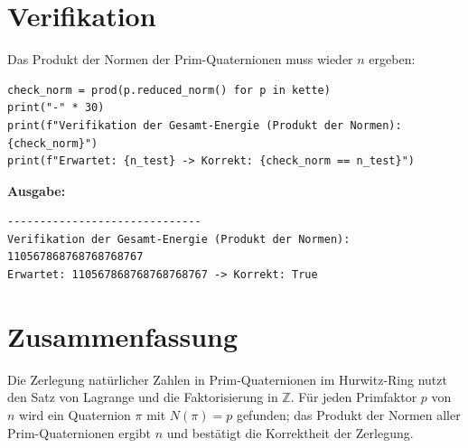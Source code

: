 \documentclass[11pt, a4paper]{article}
\begin{document}
\section{Verifikation}

Das Produkt der Normen der Prim-Quaternionen muss wieder $n$ ergeben:

\begin{lstlisting}
check_norm = prod(p.reduced_norm() for p in kette)
print("-" * 30)
print(f"Verifikation der Gesamt-Energie (Produkt der Normen): {check_norm}")
print(f"Erwartet: {n_test} -> Korrekt: {check_norm == n_test}")
\end{lstlisting}

\textbf{Ausgabe:}
\begin{verbatim}
------------------------------
Verifikation der Gesamt-Energie (Produkt der Normen): 110567868768768768767
Erwartet: 110567868768768768767 -> Korrekt: True
\end{verbatim}

\section*{Zusammenfassung}

Die Zerlegung natürlicher Zahlen in Prim-Quaternionen im Hurwitz-Ring nutzt den Satz von Lagrange und die Faktorisierung in $\mathbb{Z}$. Für jeden Primfaktor $p$ von $n$ wird ein Quaternion $\pi$ mit $N(\pi) = p$ gefunden; das Produkt der Normen aller Prim-Quaternionen ergibt $n$ und bestätigt die Korrektheit der Zerlegung.
\end{document}
